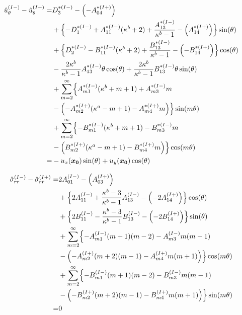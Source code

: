 \begin{align}
	\hat{u}_{\theta}^{(I-)}-\hat{u}_{\theta}^{(I+)} =&D_{3}^{*(I-)}-\Bigl(-A_{04}^{*(I+)}\Bigr)
	\nonumber
	\\
	&+\Bigl\{-D_{1}^{*(I-)}+A_{11}^{*(I-)}(\kappa^{b}+2)+\frac{A_{13}^{*(I-)}}{\kappa^{b}-1}
	-\Bigl(A_{14}^{*(I+)}\Bigr)\Bigr\}\sin(\theta)
	\nonumber
	\\
	&+\Bigl\{D_{2}^{*(I-)}-B_{11}^{*(I-)}(\kappa^{b}+2)+\frac{B_{13}^{*(I-)}}{\kappa^{b}-1}
	-\Bigl(-B_{14}^{*(I+)}\Bigr)\Bigr\}\cos(\theta)
	\nonumber
	\\
	&-\frac{2\kappa^{b}}{\kappa^{b}-1}A_{13}^{*(I-)}\theta\cos(\theta)
	+\frac{2\kappa^{b}}{\kappa^{b}-1}B_{13}^{*(I-)}\theta\sin(\theta)
	\nonumber
	\\
	&+\sum_{m=2}^{\infty}\Bigl\{A_{m1}^{*(I-)}(\kappa^{b}+m+1)
	+A_{m3}^{*(I-)}m
	\nonumber
	\\
	&-\Bigl(-A_{m2}^{*(I+)}(\kappa^{a}-m+1)
	-A_{m4}^{*(I+)}m\Bigr)\Bigr\}\sin(m\theta)
	\nonumber
	\\
	&+\sum_{m=2}^{\infty}\Bigl\{-B_{m1}^{*(I-)}(\kappa^{b}+m+1)
	-B_{m3}^{*(I-)}m
	\nonumber
	\\
	&-\Bigl(B_{m2}^{*(I+)}(\kappa^{a}-m+1)
	-B_{m4}^{*(I+)}m\Bigr)\Bigr\}\cos(m\theta)
	\nonumber
	\\
	=&-u_{x}(\bm{x_{0}})\sin(\theta)+u_{y}(\bm{x_{0}})\cos(\theta)
	\label{eq:UTh1eq}
\end{align}

\begin{align}
	\hat{\sigma}_{rr}^{(I-)}-\hat{\sigma}_{rr}^{(I+)} =
	&2A_{01}^{(I-)}-\Bigl(A_{03}^{(I+)}\Bigr)
	\nonumber
	\\
	&+\Bigl\{2A_{11}^{(I-)}+\frac{\kappa^{b}-3}{\kappa^{b}-1}A_{13}^{(I-)}
	-\Bigl(-2A_{14}^{(I+)}\Bigr)\Bigr\}\cos(\theta)
	\nonumber
	\\
	&+\Bigl\{2B_{11}^{(I-)}
	-\frac{\kappa^{b}-3}{\kappa^{b}-1}B_{13}^{(I-)}
	-\Bigl(-2B_{14}^{(I+)}\Bigr)\Bigr\}\sin(\theta)
	\nonumber
	\\
	&+\sum_{m=2}^{\infty}\Bigl\{
	-A_{m1}^{(I-)}(m+1)(m-2)-A_{m3}^{(I-)}m(m-1)
	\nonumber
	\\
	&-\Bigl(-A_{m2}^{(I+)}(m+2)(m-1)-A_{m4}^{(I+)}m(m+1)\Bigr)
	\Bigr\}\cos(m\theta)
	\nonumber
	\\
	&+\sum_{m=2}^{\infty}\Bigl\{
	-B_{m1}^{(I-)}(m+1)(m-2)-B_{m3}^{(I-)}m(m-1)
	\nonumber
	\\
	&-\Bigl(-B_{m2}^{(I+)}(m+2)(m-1)-B_{m4}^{(I+)}m(m+1)\Bigr)
	\Bigr\}\sin(m\theta)
	\nonumber
	\\
	=&0
	\label{eq:SigmaRReq}
\end{align}

